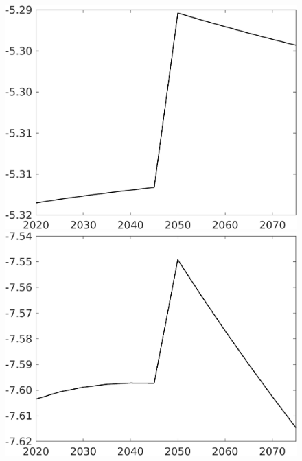 \documentclass[12pt]{article}
\begin{document}
\begin{figure}[h!!]
\begin{minipage}[]{0.32\textwidth}
	\end{minipage}	
	\begin{minipage}[]{0.32\textwidth}
		\includegraphics[width=1\textwidth]{../../codding_model/own_basedOnFried/optimalPol_010922_revision/figures/all_13Sept22/CompTaufPER_bytaul_Reg0_hl_spillover0_nsk0_xgr0_knspil1_sep0_LFlimit1_emsbase0_countec0_GovRev0_etaa0.79_lgd0.png}
	\end{minipage}	
	\begin{minipage}[]{0.32\textwidth}
		\includegraphics[width=1\textwidth]{../../codding_model/own_basedOnFried/optimalPol_010922_revision/figures/all_13Sept22/CompTaufPER_bytaul_Reg0_C_spillover0_nsk0_xgr0_knspil1_sep0_LFlimit1_emsbase0_countec0_GovRev0_etaa0.79_lgd0.png}

\end{minipage}
\end{figure}
\end{document}
